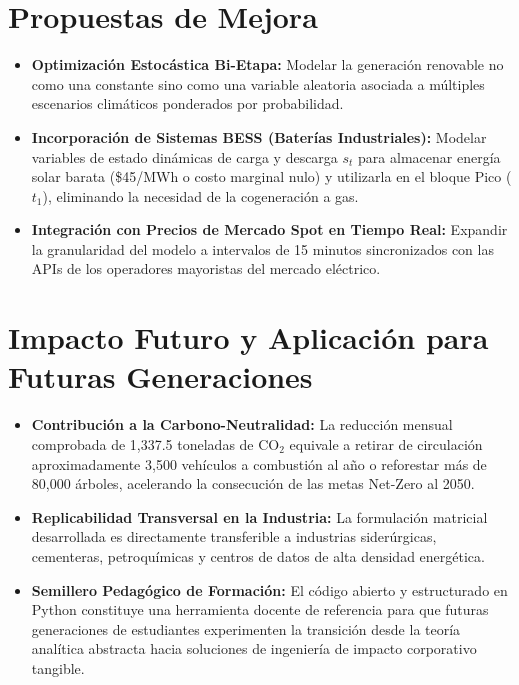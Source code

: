 \documentclass[11pt,a4paper]{article}
\begin{document}
\section{Propuestas de Mejora}
\begin{itemize}
    \item \textbf{Optimización Estocástica Bi-Etapa:} Modelar la generación renovable no como una constante sino como una variable aleatoria asociada a múltiples escenarios climáticos ponderados por probabilidad.
    \item \textbf{Incorporación de Sistemas BESS (Baterías Industriales):} Modelar variables de estado dinámicas de carga y descarga $s_t$ para almacenar energía solar barata (\$45/MWh o costo marginal nulo) y utilizarla en el bloque Pico ($t_1$), eliminando la necesidad de la cogeneración a gas.
    \item \textbf{Integración con Precios de Mercado Spot en Tiempo Real:} Expandir la granularidad del modelo a intervalos de 15 minutos sincronizados con las APIs de los operadores mayoristas del mercado eléctrico.
\end{itemize}

\section{Impacto Futuro y Aplicación para Futuras Generaciones}
\begin{itemize}
    \item \textbf{Contribución a la Carbono-Neutralidad:} La reducción mensual comprobada de 1,337.5 toneladas de $\text{CO}_2$ equivale a retirar de circulación aproximadamente 3,500 vehículos a combustión al año o reforestar más de 80,000 árboles, acelerando la consecución de las metas Net-Zero al 2050.
    \item \textbf{Replicabilidad Transversal en la Industria:} La formulación matricial desarrollada es directamente transferible a industrias siderúrgicas, cementeras, petroquímicas y centros de datos de alta densidad energética.
    \item \textbf{Semillero Pedagógico de Formación:} El código abierto y estructurado en Python constituye una herramienta docente de referencia para que futuras generaciones de estudiantes experimenten la transición desde la teoría analítica abstracta hacia soluciones de ingeniería de impacto corporativo tangible.
\end{itemize}
\end{document}

